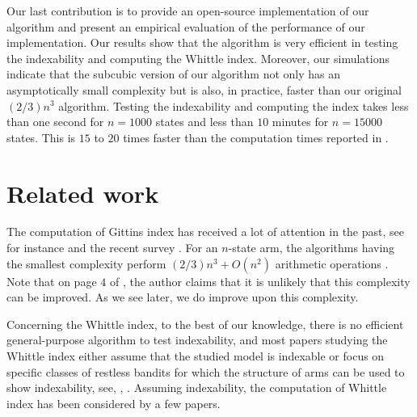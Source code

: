 Our last contribution is to provide an open-source implementation of our algorithm and present an empirical evaluation of the performance of our implementation. Our results show that the algorithm is very efficient in testing the indexability and computing the Whittle index. Moreover, our simulations indicate that the subcubic version of our algorithm not only has an asymptotically small complexity but is also, in practice, faster than our original $(2/3)n^3$ algorithm. Testing the indexability and computing the index takes less than one second for $n=1000$ states and less than $10$ minutes for $n=15000$ states. This is $15$ to $20$ times faster than the computation times reported in \cite{nino2020fast}.

\section{Related work}
\label{ch:cpt:sec:related}

The computation of Gittins index has received a lot of attention in the past, see for instance \cite{chen1986linear, katehakis1987multi, nino20072, sonin2008generalized} and the recent survey \cite{chakravorty2014multi}.
For an $n$-state arm, the algorithms having the smallest complexity perform $(2/3)n^3+O(n^2)$ arithmetic operations \cite{chakravorty2014multi}.
Note that on page $4$ of \cite{nino2020fast}, the author claims that it is unlikely that this complexity can be improved.
As we see later, we do improve upon this complexity. 

Concerning the Whittle index, to the best of our knowledge, there is no efficient general-purpose algorithm to test indexability, and most papers studying the Whittle index either assume that the studied model is indexable or focus on specific classes of restless bandits for which the structure of arms can be used to show indexability, see, \ie, \cite{aalto2011properties,akbarzadeh2019restless,akbarzadeh2021maintenance,borkar2017whittle}.
Assuming indexability, the computation of Whittle index has been considered by a few papers.

